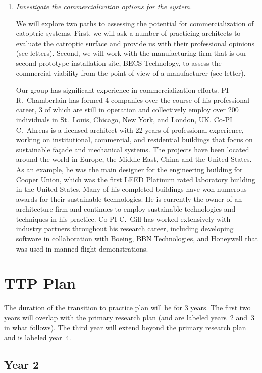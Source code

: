 \documentclass[11pt]{article}
\begin{document}
\begin{enumerate}
\item \emph{Investigate the commercialization options for the system.}

We will explore two paths to assessing the potential for commercialization
of catoptric systems.
First, we will ask a number of practicing architects to evaluate the
catroptic surface and provide us with their professional opinions
(see letters).
Second, we will work with the manufacturing firm that is our second
prototype installation site, BECS Technology, to assess the commercial
viability from the point of view of a manufacturer (see letter).

Our group has significant experience in commercialization efforts.
PI R.~Chamberlain has formed 4 companies over the course of his professional
career, 3 of which are still in operation and collectively employ
over 200 individuals in St.~Louis, Chicago, New York, and London, UK.
Co-PI C.~Ahrens is a licensed architect with 22 years of professional
experience, working on institutional, commercial, and residential
buildings that focus on sustainable fa\c{c}ade and mechanical systems.
The projects have been located around the world in Europe, the Middle East,
China and the United States. As an example, he was the main designer for
the engineering building for Cooper Union, which was the first
LEED Platinum rated laboratory building in the United States.
Many of his completed buildings have won numerous awards for their
sustainable technologies.
He is currently the owner of an architecture firm and continues
to employ sustainable technologies and techniques in his practice.  
Co-PI C.~Gill has worked extensively with industry partners throughout his
research career, including developing software in collaboration with Boeing, 
BBN Technologies, and Honeywell that was used in manned flight demonstrations.

\end{enumerate}

\section{TTP Plan}

The duration of the transition to practice plan will be for 3 years.
The first two years will overlap with the primary research plan (and
are labeled years~2 and~3 in what follows).  The third year will extend
beyond the primary research plan and is labeled year~4.

\subsection{Year 2}
\end{document}
